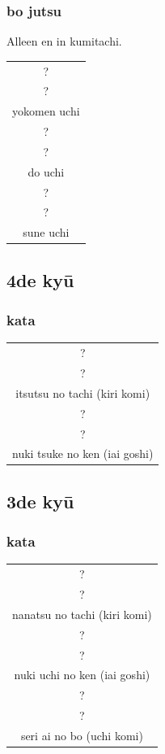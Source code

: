 \documentclass[a4paper, 12pt]{article}
\begin{document}
\begin{CJK}{UTF8}{min}
\subsubsection{bo jutsu}
\noindent Alleen en in kumitachi.
\begin{table}[H]
\begin{center}
\begin{tabular}{c}
?\\
?\\
yokomen uchi\\
\hline
?\\
?\\
do uchi\\
\hline
?\\
?\\
sune uchi
\end{tabular}
\end{center}
\label{kyuu_5_katori_bo}
\end{table}

\subsection{4de ky\={u}}
\subsubsection{kata}
\begin{table}[H]
\begin{center}
\begin{tabular}{c}
?\\
?\\
itsutsu no tachi (kiri komi)\\
\hline
?\\
?\\
nuki tsuke no ken (iai goshi)
\end{tabular}
\end{center}
\label{kyuu_4_katori_kata}
\end{table}

\subsection{3de ky\={u}}
\subsubsection{kata}
\begin{table}[H]
\begin{center}
\begin{tabular}{c}
?\\
?\\
nanatsu no tachi (kiri komi)\\
\hline
?\\
?\\
nuki uchi no ken (iai goshi)\\
\hline
?\\
?\\
seri ai no bo (uchi komi)
\end{tabular}
\end{center}
\label{kyuu_3_katori_kata}
\end{table}


\end{CJK}
\end{document}
